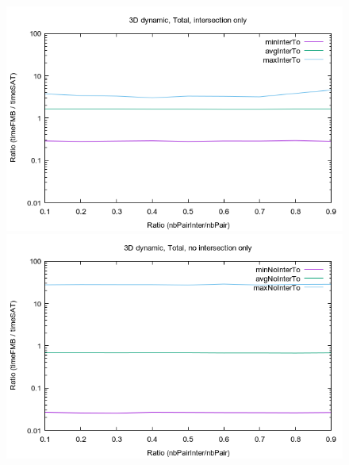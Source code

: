 \documentclass[12pt, a4paper]{article}
\begin{document}
\begin{center}
\begin{figure}[H]
\centering\includegraphics[width=12cm]{../Results/qualification3DTimeinter.png}\\
\centering\includegraphics[width=12cm]{../Results/qualification3DTimenointer.png}\\
\end{figure}
\end{center}
\end{document}
